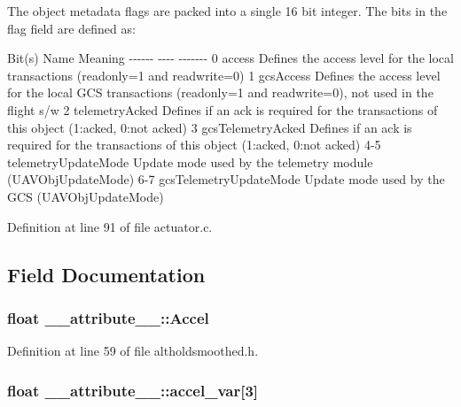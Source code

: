 \-The object metadata flags are packed into a single 16 bit integer. \-The bits in the flag field are defined as\-:

\-Bit(s) \-Name \-Meaning -\/-\/-\/-\/-\/-\/ -\/-\/-\/-\/ -\/-\/-\/-\/-\/-\/-\/ 0 access \-Defines the access level for the local transactions (readonly=1 and readwrite=0) 1 gcs\-Access \-Defines the access level for the local \-G\-C\-S transactions (readonly=1 and readwrite=0), not used in the flight s/w 2 telemetry\-Acked \-Defines if an ack is required for the transactions of this object (1\-:acked, 0\-:not acked) 3 gcs\-Telemetry\-Acked \-Defines if an ack is required for the transactions of this object (1\-:acked, 0\-:not acked) 4-\/5 telemetry\-Update\-Mode \-Update mode used by the telemetry module (\-U\-A\-V\-Obj\-Update\-Mode) 6-\/7 gcs\-Telemetry\-Update\-Mode \-Update mode used by the \-G\-C\-S (\-U\-A\-V\-Obj\-Update\-Mode) 

\-Definition at line 91 of file actuator.\-c.



\subsection{\-Field \-Documentation}
\hypertarget{struct____attribute_____a0335bf36bf8f2981b61316861d50a194}{
\subsubsection[{\-Accel}]{\setlength{\rightskip}{0pt plus 5cm}float {\bf \-\_\-\-\_\-attribute\-\_\-\-\_\-\-::\-Accel}}}\label{struct____attribute_____a0335bf36bf8f2981b61316861d50a194}


\-Definition at line 59 of file altholdsmoothed.\-h.

\hypertarget{struct____attribute_____a2cbd061fa75538d206551474df32c366}{
\subsubsection[{accel\-\_\-var}]{\setlength{\rightskip}{0pt plus 5cm}float {\bf \-\_\-\-\_\-attribute\-\_\-\-\_\-\-::accel\-\_\-var}\mbox{[}3\mbox{]}}}\label{struct____attribute_____a2cbd061fa75538d206551474df32c366}



